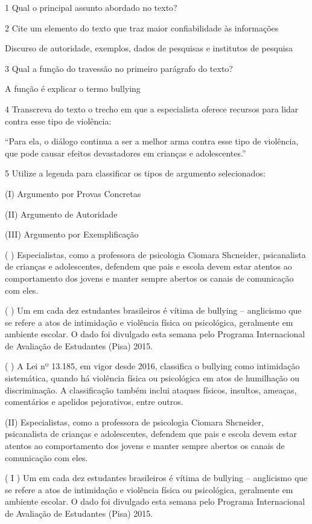 {\num{1} Qual o principal assunto abordado no texto?


\num{2} Cite um elemento do texto que traz maior confiabilidade às informações

Discurso de autoridade, exemplos, dados de pesquisas e institutos de
pesquisa

\num{3} Qual a função do travessão no primeiro parágrafo do texto?

A função é explicar o termo bullying

\num{4} Transcreva do texto o trecho em que a especialista oferece recursos para lidar contra esse tipo de violência:

``Para ela, o diálogo continua a ser a melhor arma contra esse tipo de
violência, que pode causar efeitos devastadores em crianças e
adolescentes.''

\num{5} Utilize a legenda para classificar os tipos de argumento selecionados:

(I) Argumento por Provas Concretas

(II) Argumento de Autoridade

(III) Argumento por Exemplificação

( ) Especialistas, como a professora de psicologia Ciomara Shcneider,
psicanalista de crianças e adolescentes, defendem que pais e escola
devem estar atentos ao comportamento dos jovens e manter sempre abertos
os canais de comunicação com eles.

( ) Um em cada dez estudantes brasileiros é vítima de bullying --
anglicismo que se refere a atos de intimidação e violência física ou
psicológica, geralmente em ambiente escolar. O dado foi divulgado esta
semana pelo Programa Internacional de Avaliação de Estudantes (Pisa)
2015.

( ) A Lei nº 13.185, em vigor desde 2016, classifica o bullying como
intimidação sistemática, quando há violência física ou psicológica em
atos de humilhação ou discriminação. A classificação também inclui
ataques físicos, insultos, ameaças, comentários e apelidos pejorativos,
entre outros.

(II) Especialistas, como a professora de psicologia Ciomara Shcneider,
psicanalista de crianças e adolescentes, defendem que pais e escola
devem estar atentos ao comportamento dos jovens e manter sempre abertos
os canais de comunicação com eles.

( I ) Um em cada dez estudantes brasileiros é vítima de bullying --
anglicismo que se refere a atos de intimidação e violência física ou
psicológica, geralmente em ambiente escolar. O dado foi divulgado esta
semana pelo Programa Internacional de Avaliação de Estudantes (Pisa)
2015.

}
